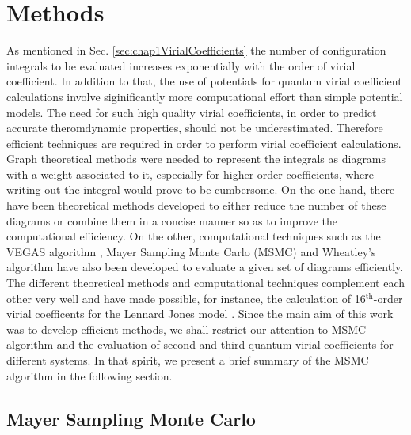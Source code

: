 \chapter{Methods}
\label{chap:methods}
\khExplicitPfalse
\graphicspath{{/home/ram/Desktop/Acads/Phd/dissertation/psuThesis/Chapter-2/Figures/}{/usr/users/rsubrama/Desktop/Acads/Phd/dissertation/psuThesis/Chapter-2/Figures/}}
    As mentioned in Sec. \ref{sec:chap1VirialCoefficients} the number of configuration integrals to be evaluated increases exponentially with the order of virial coefficient. In addition to that, the use of \abinitio{} potentials for quantum virial coefficient calculations involve siginificantly more computational effort than simple potential models. The need for such high quality virial coefficients, in order to predict accurate theromdynamic properties, should not be underestimated. Therefore efficient techniques are required in order to perform virial coefficient calculations. Graph theoretical methods were needed to represent the integrals as diagrams with a weight associated to it, especially for higher order coefficients, where writing out the integral would prove to be cumbersome. On the one hand, there have been theoretical methods \cite{Ree1964,Hellmann2011} developed to either reduce the number of these diagrams or combine them in a concise manner so as to improve the computational efficiency. On the other, computational techniques such as the VEGAS algorithm \cite{Lepage1972}, Mayer Sampling Monte Carlo (MSMC) \cite{Singh2004} and Wheatley's algorithm \cite{Wheatley2013} have also been developed to evaluate a given set of diagrams efficiently. The different theoretical methods and computational techniques complement each other very well and have made possible, for instance, the calculation of 16$^{\text{th}}$-order virial coefficents for the Lennard Jones model \cite{Feng2015}. Since the main aim of this work was to develop efficient methods, we shall restrict our attention to MSMC algorithm and the evaluation of second and third quantum virial coefficients for different systems. In that spirit, we present a brief summary of the MSMC algorithm in the following section.

\section{Mayer Sampling Monte Carlo}
    \label{sec:MSMC}
